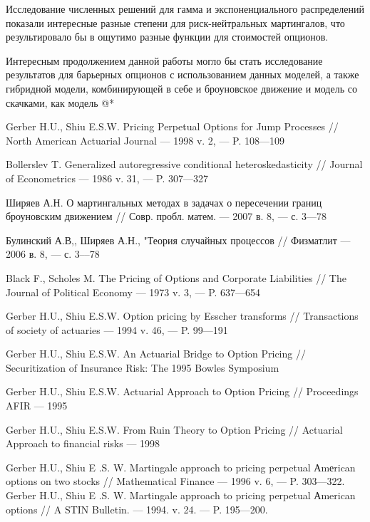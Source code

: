 \documentclass[a4paper,12pt]{article}
\makeatletter
\theoremstyle{definition}
\newcommand*{\rom}[1]{\expandafter\@slowromancap\romannumeral #1@}
\makeatother
\begin{document}
Исследование численных решений для гамма и экспоненциального распределений показали интересные разные степени для риск-нейтральных мартингалов, что результировало бы в ощутимо разные функции для стоимостей опционов.

Интересным продолжением данной работы могло бы стать исследование результатов для барьерных опционов с использованием данных моделей, а также гибридной модели, комбинирующей в себе и броуновское движение и модель со скачками, как модель \rom{1}* \cite{bib:GerberShiu}


\begin{thebibliography}{10}
Gerber H.U., Shiu E.S.W. Pricing Perpetual Options for Jump Processes // North American Actuarial Journal --- 1998  v. 2, --- P. 108---109

Bollerslev T. Generalized autoregressive conditional heteroskedasticity // Journal of Econometrics --- 1986  v. 31, --- P. 307---327

Ширяев А.Н. О мартингальных методах в задачах о пересечении границ броуновским движением // Совр. пробл. матем. --- 2007 в. 8, --- с. 3–--78

Булинский А.В,, Ширяев А.Н., "Теория случайных процессов // Физматлит --- 2006 в. 8, --- с. 3–--78

Black F., Scholes M. The Pricing of Options and Corporate Liabilities // The Journal of Political Economy --- 1973 v. 3, --- P. 637---654

Gerber H.U., Shiu E.S.W. Option pricing by Esscher transforms // Transactions of society of actuaries --- 1994 v. 46, --- P. 99---191

Gerber H.U., Shiu E.S.W. An Actuarial Bridge
to Option Pricing // Securitization of Insurance Risk: The 1995 Bowles Symposium

Gerber H.U., Shiu E.S.W. Actuarial Approach to Option Pricing // Proceedings AFIR --- 1995

Gerber H.U., Shiu E.S.W. From Ruin Theory to Option Pricing // Actuarial Approach to financial risks --- 1998

Gerber H.U., Shiu E .S. W. Martingale approach to pricing perpetual Аmеrican options on two stocks // Mathematical Finance --- 1996 v. 6, --- P. 303---322.
Gerber H.U., Shiu E .S. W. Martingale approach to pricing perpetual Аmerican options // A STIN Bulletin. --- 1994. v. 24. --- P. 195---200.


\end{thebibliography}
\end{document}
